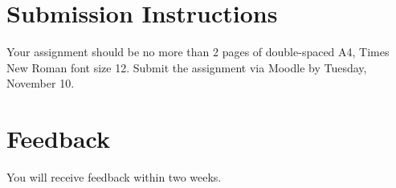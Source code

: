 \documentclass[a4, 12pt]{article}
\begin{document}
\section{Submission Instructions}

Your assignment should be no more than 2 pages of double-spaced A4, Times New Roman font size 12. Submit the assignment via Moodle by Tuesday, November 10.

\section{Feedback}

You will receive feedback within two weeks.
\end{document}

